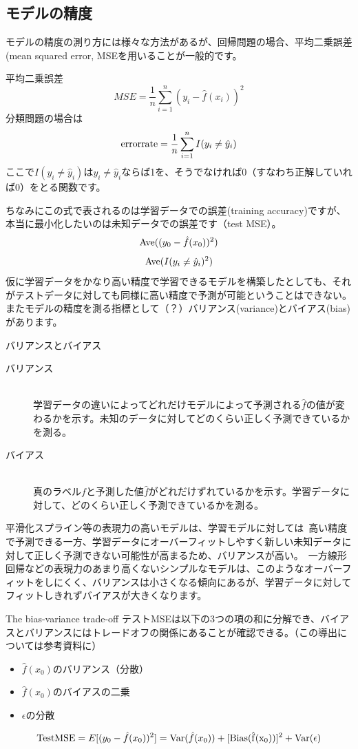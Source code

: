 \documentclass[uplatex]{jsarticle}
\begin{document}
\subsection{モデルの精度}
モデルの精度の測り方には様々な方法があるが、回帰問題の場合、平均二乗誤差(mean squared error, MSEを用いることが一般的です。
\begin{itembox}[l]{平均二乗誤差}
    $$MSE = \frac{1}{n}\sum_{i=1}^n (y_i - \hat{f}(x_i))^2$$
    分類問題の場合は
    $${\rm error rate} = \frac{1}{n}\sum_{i=1}^n I(y_i \neq \hat{y}_i)$$
    ここで$I(y_i \neq \hat{y}_i)$は$y_i \neq \hat{y}_i$ならば1を、そうでなければ0（すなわち正解していれば0）をとる関数です。
\end{itembox}
ちなみにこの式で表されるのは学習データでの誤差(training accuracy)ですが、本当に最小化したいのは未知データでの誤差です（test MSE）。\
$${\rm Ave}((y_0 - \hat{f}(x_0))^2)$$
$${\rm Ave}(I(y_i \neq \hat{y}_i)^2)$$
仮に学習データをかなり高い精度で学習できるモデルを構築したとしても、それがテストデータに対しても同様に高い精度で予測が可能ということはできない。
またモデルの精度を測る指標として（？）バリアンス(variance)とバイアス(bias)があります。
\begin{itembox}[l]{バリアンスとバイアス}
  \begin{description}
    \item [バリアンス]\mbox{}\\
    学習データの違いによってどれだけモデルによって予測される$\hat{f}$の値が変わるかを示す。未知のデータに対してどのくらい正しく予測できているかを測る。
    \item [バイアス]\mbox{}\\
    真のラベル$f$と予測した値$\hat{f}$がどれだけずれているかを示す。学習データに対して、どのくらい正しく予測できているかを測る。
  \end{description}
\end{itembox}
平滑化スプライン等の表現力の高いモデルは、学習モデルに対しては\
高い精度で予測できる一方、学習データにオーバーフィットしやすく新しい未知データに対して正しく予測できない可能性が高まるため、バリアンスが高い。\
一方線形回帰などの表現力のあまり高くないシンプルなモデルは、このようなオーバーフィットをしにくく、バリアンスは小さくなる傾向にあるが、学習データに対してフィットしきれずバイアスが大きくなります。

\begin{itembox}[l]{ The bias-variance trade-off}
  テストMSEは以下の3つの項の和に分解でき、バイアスとバリアンスにはトレードオフの関係にあることが確認できる。（この導出については参考資料に）
  \begin{itemize}
    \item $\hat{f}(x_0)$のバリアンス（分散）
    \item $\hat{f}(x_0)$のバイアスの二乗
    \item $\epsilon$の分散
  \end{itemize}
  $${\rm Test MSE} = E[(y_0 - \hat{f}(x_0))^2] = {\rm Var}(\hat{f}(x_0)) + [{\rm Bias (\hat{f}(x_0))}]^2 + {\rm Var}(\epsilon)$$
\end{itembox}
\end{document}
